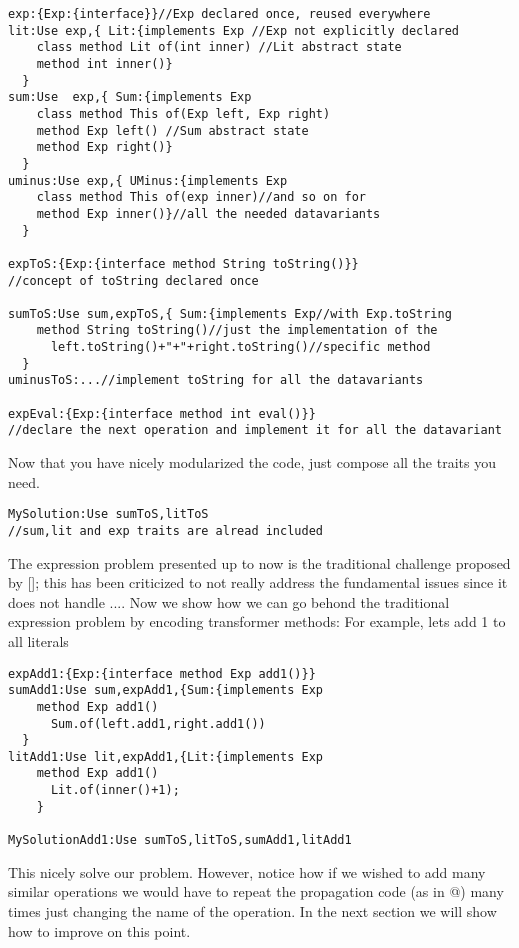 \begin{lstlisting}
exp:{Exp:{interface}}//Exp declared once, reused everywhere
lit:Use exp,{ Lit:{implements Exp //Exp not explicitly declared
    class method Lit of(int inner) //Lit abstract state
    method int inner()}
  }
sum:Use  exp,{ Sum:{implements Exp 
    class method This of(Exp left, Exp right)
    method Exp left() //Sum abstract state
    method Exp right()}
  }  
uminus:Use exp,{ UMinus:{implements Exp 
    class method This of(exp inner)//and so on for
    method Exp inner()}//all the needed datavariants
  }   
  
expToS:{Exp:{interface method String toString()}}
//concept of toString declared once

sumToS:Use sum,expToS,{ Sum:{implements Exp//with Exp.toString
    method String toString()//just the implementation of the
      left.toString()+"+"+right.toString()//specific method
  }
uminusToS:...//implement toString for all the datavariants

expEval:{Exp:{interface method int eval()}}
//declare the next operation and implement it for all the datavariant
\end{lstlisting}

Now that you have nicely modularized the code, just compose all the traits you need.
\begin{lstlisting}
MySolution:Use sumToS,litToS
//sum,lit and exp traits are alread included
\end{lstlisting}

The expression problem presented up to now is the traditional challenge proposed by [];
this has been criticized to not really address the fundamental issues since it does not handle ....
Now we show how we can go behond the traditional expression problem by encoding transformer methods:
For example, lets add 1 to all literals
\begin{lstlisting}
expAdd1:{Exp:{interface method Exp add1()}}
sumAdd1:Use sum,expAdd1,{Sum:{implements Exp
    method Exp add1()
      Sum.of(left.add1,right.add1())
  }
litAdd1:Use lit,expAdd1,{Lit:{implements Exp
    method Exp add1()
      Lit.of(inner()+1);
    }

MySolutionAdd1:Use sumToS,litToS,sumAdd1,litAdd1
\end{lstlisting}

This nicely solve our problem. 
However, notice how if we wished to add many similar operations we would 
have to repeat the propagation code (as in @) many times
just changing the name of the operation.
In the next section we will show how to improve on this point.


